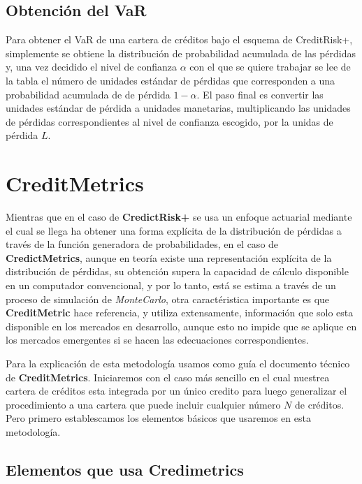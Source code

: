 \documentclass[
  12pt,
]{krantz}
\theoremstyle{definition}
\theoremstyle{definition}
\theoremstyle{definition}
\theoremstyle{remark}
\begin{document}
\hypertarget{obtencion-del-var}{%
\section{Obtención del VaR}\label{obtencion-del-var}}

Para obtener el VaR de una cartera de créditos bajo el esquema de CreditRisk+, simplemente se obtiene la distribución
de probabilidad acumulada de las pérdidas y, una vez decidido el nivel de confianza \(\alpha\) con el que se quiere trabajar se lee de la tabla el número de unidades estándar de pérdidas que corresponden a una probabilidad acumulada de de pérdida \(1-\alpha\). El paso final es convertir las unidades estándar de pérdida a unidades manetarias, multiplicando las unidades de pérdidas correspondientes al nivel de confianza escogido, por la unidas de pérdida \(L\).

\mainmatter

\hypertarget{creditmetrics}{%
\chapter{CreditMetrics}\label{creditmetrics}}

Mientras que en el caso de \textbf{CredictRisk+} se usa un enfoque actuarial mediante el cual se llega ha obtener una forma explícita de la distribución de pérdidas a través de la función generadora de probabilidades, en el caso de \textbf{CredictMetrics}, aunque en teoría existe una representación explícita de la distribución de pérdidas, su obtención supera la capacidad de cálculo disponible en un computador convencional, y por lo tanto, está se estima a través de un proceso de simulación de \emph{MonteCarlo}, otra caractéristica importante es que \textbf{CreditMetric} hace referencia, y utiliza extensamente, información que solo esta disponible en los mercados en desarrollo, aunque esto no impide que se aplique en los mercados emergentes si se hacen las edecuaciones correspondientes.

Para la explicación de esta metodología usamos como guía el documento técnico de \textbf{CreditMetrics}. Iniciaremos con el caso más sencillo en el cual nuestrea cartera de créditos esta integrada por un único credito para luego generalizar el procedimiento a una cartera que puede incluir cualquier número \(N\) de créditos. Pero primero establescamos los elementos básicos que usaremos en esta metodología.

\hypertarget{elementos-que-usa-credimetrics}{%
\section{\texorpdfstring{Elementos que usa \textbf{Credimetrics}}{Elementos que usa Credimetrics}}\label{elementos-que-usa-credimetrics}}
\end{document}
